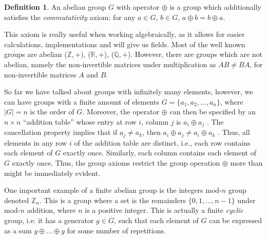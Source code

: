 \documentclass{Resources/UoBLab1}
\theoremstyle{definition}
\newtheorem{definition}[theorem]{Definition}
\begin{document}
\begin{definition}
    An abelian group $G$ with operator $\oplus$ is a group which additionally satisfies the \textit{commutativity} axiom: for any $a \in G$, $b \in G$, $a \oplus b = b \oplus a$.
\end{definition}
This axiom is really useful when working algebraically, as it allows for easier calculations, implementations and will give us fields. Most of the well known groups are abelian ($\mathbb{Z}, +$), ($\mathbb{R}, +$), ($\mathbb{Q}, +$). However, there are groups which are not abelian, namely the non-invertible matrices under multiplication as $AB \ne BA$, for non-invertible matrices $A$ and $B$.

So far we have talked about groups with infinitely many elements, however, we can have groups with a finite amount of elements $G = \{a_1 , a_2, ..., a_n\}$, where $|G| = n$ is the order of $G$. Moreover, the operator $\oplus$ can then be specified by an $n \times n$ “addition table” whose entry at row $i$, column $j$ is $a_i \oplus a_j$ . The cancellation property implies that if $a_j \ne a_k$, then $a_i \oplus a_j \ne a_i \oplus a_k$ . Thus, all elements in any row $i$ of the addition table are distinct, i.e., each row contains each element of $G$ exactly once. Similarly, each column contains each element of $G$ exactly once. Thus, the group axioms restrict the group operation $\oplus$ more than might be immediately evident.

One important example of a finite abelian group is the integers mod-$n$ group denoted $\mathbb{Z}_n$. This is a group where a set is the remainders $\{0, 1, ..., n - 1\}$ under mod-$n$ addition, where $n$ is a positive integer. This is actually a finite \textit{cyclic} group, i.e. it has a generator $g \in G$, such that each element of $G$ can be expressed as a sum $g\oplus ... \oplus g$ for some number of repetitions.
\end{document}
